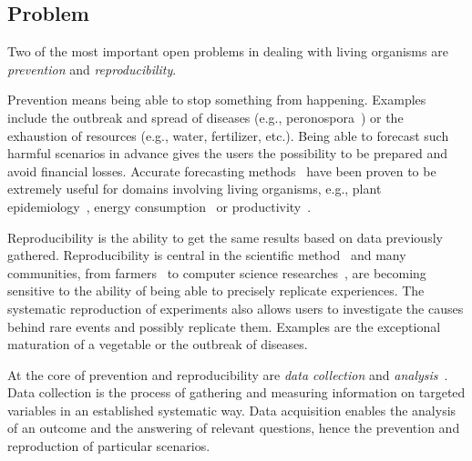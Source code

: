 \subsection{Problem}\label{sec:problem}



Two of the most important open problems in dealing
with living organisms are \emph{prevention} and \emph{reproducibility}.

Prevention means being able to stop something from happening. Examples include
the outbreak and spread of diseases (e.g., peronospora~\cite{palti1980downy}) or the exhaustion of resources (e.g., water, fertilizer, etc.).
Being able to forecast such harmful scenarios in advance gives the users the possibility to be prepared and avoid financial losses. Accurate forecasting methods~\cite{box2005statistics} have been proven to be extremely useful for domains
involving living organisms, e.g.,
plant epidemiology~\cite{campbell1990introduction,huber1992modeling},
energy consumption~\cite{neto2008comparison}
or productivity~\cite{nahmias2009production, montgomery1990forecasting}.

Reproducibility is the ability to get the same results based on data previously gathered.
Reproducibility is central in the scientific method~\cite{repko2008interdisciplinary} and many communities, from farmers~\cite{discoverableagriculture} to computer science researches~\cite{peng2011reproducible}, are
becoming sensitive to the ability of being able 
to precisely replicate experiences.
The systematic reproduction of experiments also allows users
to investigate the causes behind rare events and possibly replicate them.
Examples are the exceptional maturation of a vegetable or the outbreak of diseases. 

At the core of prevention and reproducibility are \emph{data collection} and \emph{analysis}~\cite{hey2009fourth,chen2014big}.
Data collection is the process of gathering and measuring information on targeted variables in an established systematic way. Data acquisition enables the analysis of an outcome and the answering of relevant questions,
hence the prevention and reproduction of particular scenarios.

